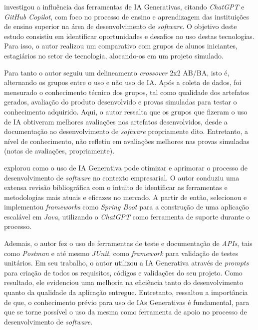 \documentclass[english,brazilian]{UNISINOSartigo} %
\begin{document}
 investigou a influência das ferramentas de IA Generativas, citando \textit{ChatGPT} e \textit{GitHub Copilot}, com foco no processo de ensino e aprendizagem das instituições de ensino superior na área de desenvolvimento de \textit{software}. O objetivo deste estudo consistiu em identificar oportunidades e desafios no uso destas tecnologias. Para isso, o autor realizou um comparativo com grupos de alunos iniciantes, estagiários no setor de tecnologia, alocando-os em um projeto simulado.

Para tanto o autor \cite{santos2024} seguiu um delineamento \textit{crossover} 2x2 AB/BA, isto é, alternando os grupos entre o uso e não uso de IA. Após a coleta de dados, foi mensurado o conhecimento técnico dos grupos, tal como qualidade dos artefatos gerados, avaliação do produto desenvolvido e provas simuladas para testar o conhecimento adquirido. Aqui, o autor ressalta que os grupos que fizeram o uso de IA obtiveram melhores avaliações nos artefatos desenvolvidos, desde a documentação ao desenvolvimento de \textit{software} propriamente dito. Entretanto, a nível de conhecimento, não refletiu em avaliações melhores nas provas simuladas (notas de avaliações, propriamente).

 explorou como o uso de IA Generativa pode otimizar e aprimorar o processo de desenvolvimento de \textit{software} no contexto empresarial. O autor conduziu uma extensa revisão bibliográfica com o intuito de identificar as ferramentas e metodologias mais atuais e eficazes no mercado. A partir de então, selecionou e implementou \textit{frameworks} como \textit{Spring Boot} para a construção de uma aplicação escalável em \textit{Java}, utilizando o \textit{ChatGPT} como ferramenta de suporte durante o processo.

Ademais, o autor \cite{costa2024} fez o uso de ferramentas de teste e documentação de \textit{APIs}, tais como \textit{Postman} e até mesmo \textit{JUnit}, como \textit{framework} para validação de testes unitários. Em seu trabalho, o autor utilizou a IA Generativa através de \textit{prompts} para criação de todos os requisitos, códigos e validações do seu projeto. Como resultado, ele evidenciou uma melhoria na eficiência tanto do desenvolvimento quanto da qualidade da aplicação entregue. Entretanto, ressaltou a importância de que, o conhecimento prévio para uso de IAs Generativas é fundamental, para que se torne possível o uso da mesma como ferramenta de apoio no processo de desenvolvimento de \textit{software}.
\end{document}
